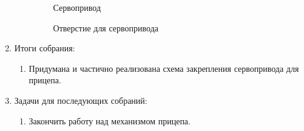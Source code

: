 \begin{enumerate}
\begin{enumerate}
      \begin{figure}[H]
      	\begin{minipage}[h]{0.47\linewidth}
      		\caption{Сервопривод}
      	\end{minipage}
      	\hfill
      	\begin{minipage}[h]{0.47\linewidth}
      		\caption{Отверстие для сервопривода}
      	\end{minipage}
      \end{figure}
      
    \end{enumerate}
    
	\item Итоги собрания: \newline
	\begin{enumerate}
	  \item Придумана и частично реализована схема закрепления сервопривода для прицепа.\newline
	  
    \end{enumerate}
    
	\item Задачи для последующих собраний:\newline
	\begin{enumerate}
	  \item Закончить работу над механизмом прицепа.\newline
	  
    \end{enumerate}     
\end{enumerate}

\fillpage
